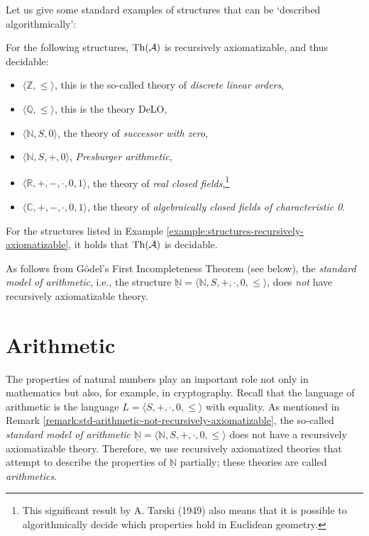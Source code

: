 Let us give some standard examples of structures that can be `described algorithmically':

\begin{example}\label{example:structures-recursively-axiomatizable}
For the following structures, $\operatorname{Th}(\mathcal{A})$ is recursively axiomatizable, and thus decidable:

\begin{itemize}
    \item $\langle \mathbb{Z}, \leq \rangle$, this is the so-called theory of \emph{discrete linear orders},        
    \item $\langle \mathbb{Q}, \leq \rangle$, this is the theory DeLO,
    \item $\langle \mathbb{N}, S, 0 \rangle$, the theory of \emph{successor with zero},
    \item $\langle \mathbb{N}, S, +, 0 \rangle$, \emph{Presburger arithmetic},
    \item $\langle \mathbb{R}, +, -, \cdot, 0, 1 \rangle$, the theory of \emph{real closed fields},\footnote{This significant result by A. Tarski (1949) also means that it is possible to algorithmically decide which properties hold in Euclidean geometry.}
    \item $\langle \mathbb{C}, +, -, \cdot, 0, 1 \rangle$, the theory of \emph{algebraically closed fields of characteristic 0}.
\end{itemize}
\end{example}
   
\begin{corollary}
    For the structures listed in Example \ref{example:structures-recursively-axiomatizable}, it holds that $\operatorname{Th}(\mathcal{A})$ is decidable.
\end{corollary}


\begin{remark}\label{remark:std-arithmetic-not-recursively-axiomatizable}
    As follows from Gödel's First Incompleteness Theorem (see below), the \emph{standard model of arithmetic}, i.e., the structure $\underline{\mathbb{N}} = \langle \mathbb{N}, S, +, \cdot, 0, \leq \rangle$, does \emph{not} have recursively axiomatizable theory.
\end{remark}


\section{Arithmetic}

The properties of natural numbers play an important role not only in mathematics but also, for example, in cryptography. Recall that the language of arithmetic is the language $L = \langle S, +, \cdot, 0, \leq \rangle$ with equality. As mentioned in Remark \ref{remark:std-arithmetic-not-recursively-axiomatizable}, the so-called \emph{standard model of arithmetic} $\underline{\mathbb{N}} = \langle \mathbb{N}, S, +, \cdot, 0, \leq \rangle$ does not have a recursively axiomatizable theory. Therefore, we use recursively axiomatized theories that attempt to describe the properties of $\underline{\mathbb{N}}$ partially; these theories are called \emph{arithmetics}.

